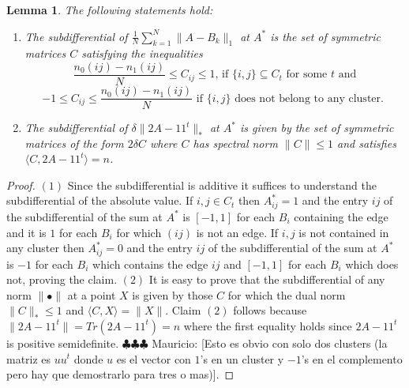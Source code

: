 \documentclass[12pt]{amsart}
\newtheorem{lemma}{Lemma}[section]
\theoremstyle{remark}
\newcommand{\mv}[1]{{\color{red} \sf $\clubsuit\clubsuit\clubsuit$ Mauricio: [#1]}}
\begin{document}
\begin{lemma} The following statements hold:
\label{lem: subdiff}
\begin{enumerate}
\item The subdifferential of $\frac{1}{N}\sum_{k=1}^N\|A-B_k\|_1$ at $A^*$ is the set of symmetric matrices $C$ satisfying the inequalities
\[ \frac{n_0(ij)-n_1(ij)}{N}\leq C_{ij}\leq 1 \text{, if $\{i,j\}\subseteq C_t$ for some $t$ and}\]
\[-1\leq C_{ij} \leq \frac{n_0(ij)-n_1(ij)}{N} \text{ if $\{i,j\}$ does not belong to any cluster. } \]
\item The subdifferential of $\delta\|2A-11^t\|_{*}$ at $A^*$ is given by the set of symmetric matrices of the form $2\delta C$ where $C$ has spectral norm $\|C\|\leq 1$ and satisfies $\langle C, 2A-11^t\rangle = n$.

\end{enumerate}

\end{lemma}
\begin{proof} $(1)$ Since the subdifferential is additive it suffices to understand the subdifferential of the absolute value. If $i,j\in C_t$ then $A^*_{ij}=1$ and the entry $ij$ of the subdifferential of the sum at $A^*$ is $[-1,1]$ for each $B_i$ containing the edge and it is $1$ for each $B_i$ for which $(ij)$ is not an edge. If $i,j$ is not contained in any cluster then $A^*_{ij}=0$ and the entry $ij$ of the subdifferential of the sum at $A^*$ is $-1$ for each $B_i$ which contains the edge $ij$ and $[-1,1]$ for each $B_i$ which does not, proving the claim. $(2)$ It is easy to prove that the subdifferential of any norm $\|\bullet\|$ at a point $X$ is given by those $C$ for which the dual norm $\|C\|_*\leq 1$ and $\langle C,X\rangle =\|X\|$. Claim $(2)$ follows because $\|2A-11^t\|=Tr(2A-11^t)=n$ where the first equality holds since $2A-11^t$ is positive semidefinite.\mv{Esto es obvio con solo dos clusters (la matriz es $uu^t$ donde $u$ es el vector con $1$'s en un cluster y $-1$'s en el complemento pero hay que demostrarlo para tres o mas)}.
\end{proof}
\end{document}
